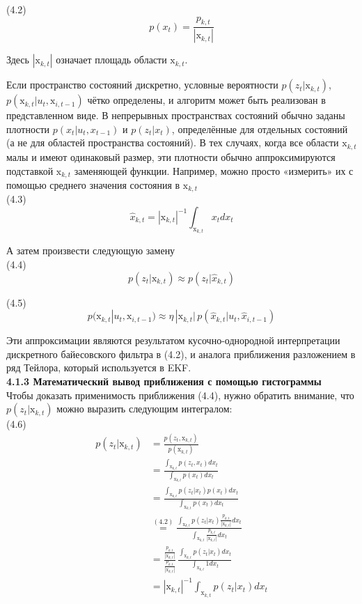 \documentclass[10pt,a4paper]{article}
\begin{document}
(4.2)
$$p(x_t)=\frac{p_{k,t}}{|\text{x}_{k,t}|}$$
	
Здесь $|\text{x}_{k,t}|$ означает площадь области $\text{x}_{k,t}$.

Если пространство состояний дискретно, условные вероятности $p(z_t|\text{x}_{k,t})$, $p(\text{x}_{k,t}|u_t, \text{x}_{i,t-1})$  чётко определены, и алгоритм может быть реализован в представленном виде. В непрерывных пространствах состояний обычно заданы плотности $p(x_t | u_t, x_{t-1})$ и $p(z_t | x_t)$, определённые для отдельных состояний (а не для областей пространства состояний). В тех случаях, когда все области $\text{x}_{k,t}$
малы и имеют одинаковый размер, эти плотности обычно аппроксимируются подставкой $\text{x}_{k,t}$ заменяющей функции. Например, можно просто «измерить» их с помощью среднего значения состояния в $\text{x}_{k,t}$\\

(4.3)
$$\hat{x}_{k,t}=|\text{x}_{k,t}|^{-1}\int_{\text{x}_{k,t}}x_t dx_t$$

А затем произвести следующую замену\\

(4.4)
$$p(z_t|\text{x}_{k,t})\approx p(z_t|\hat{x}_{k,t})$$

(4.5)
$$p(\text{x}_{k,t}|u_t,\text{x}_{i,t-1})\approx\eta\,|\text{x}_{k,t}|\,p(\hat{x}_{k,t}|u_t,\hat{x}_{i,t-1})$$

Эти аппроксимации являются результатом кусочно-однородной интерпретации дискретного байесовского фильтра в (4.2), и аналога приближения разложением в ряд Тейлора, который используется в EKF.\\

\textbf{4.1.3 Математический вывод приближения с помощью гистограммы }\\

Чтобы доказать применимость приближения (4.4), нужно обратить внимание, что $p(z_t | \text{x}_{k,t})$ можно выразить следующим интегралом:\\

(4.6)
\begin{equation*}
\begin{split}
p(z_t|\text{x}_{k,t})&=\frac{p(z_t,\text{x}_{k,t})}{p(\text{x}_{k,t})}\\
&=\frac{\int_{\text{x}_{k,t}} p(z_t,x_t)dx_t}{\int_{\text{x}_{k,t}}p(x_t)dx_t}\\
&=\frac{\int_{\text{x}_{k,t}} p(z_t|x_t)p(x_t)dx_t}{\int_{\text{x}_{k,t}}p(x_t)dx_t}\\
&\stackrel{(4.2)}{=}\frac{\int_{\text{x}_{k,t}} p(z_t|x_t)\frac{p_{k,t}}{|\text{x}_{k,t}|}dx_t}{\int_{\text{x}_{k,t}}\frac{p_{k,t}}{|\text{x}_{k,t}|}dx_t}\\
&=\frac{\frac{p_{k,t}}{|\text{x}_{k,t}|}}{\frac{p_{k,t}}{|\text{x}_{k,t}|}}\,\frac{\int_{\text{x}_{k,t}} p(z_t|x_t)dx_t}{\int_{\text{x}_{k,t}}1dx_t}\\
&=|\text{x}_{k,t}|^{-1}\int_{\text{x}_{k,t}}p(z_t|x_t)dx_t
\end{split}
\end{equation*}
\end{document}
